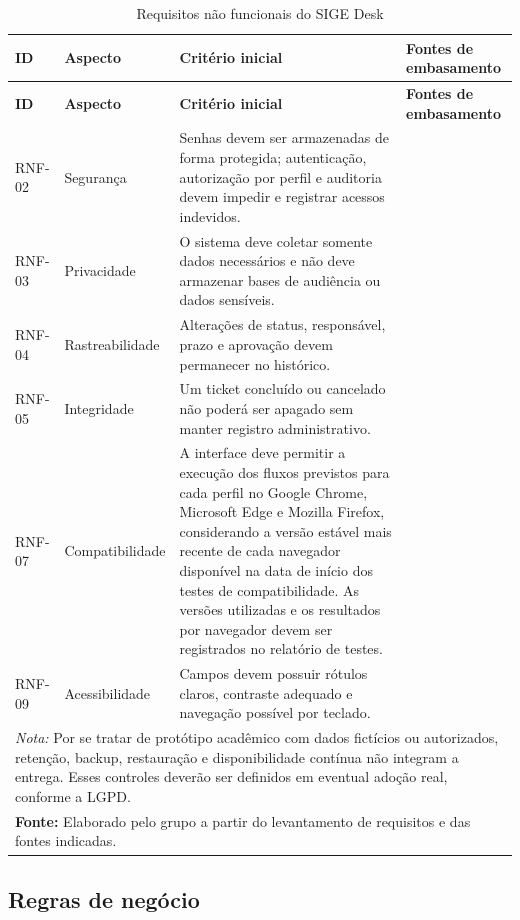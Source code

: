 \begin{longtable}{p{}p{}p{}p{}}
\caption{Requisitos não funcionais do SIGE Desk}\label{tab:requisitos-nao-funcionais}\\
\hline
\textbf{ID} & \textbf{Aspecto} & \textbf{Critério inicial} & \textbf{Fontes de embasamento} \\
\hline
\endfirsthead
\hline
\textbf{ID} & \textbf{Aspecto} & \textbf{Critério inicial} & \textbf{Fontes de embasamento} \\
\hline
\endhead
RNF-02 & Segurança & Senhas devem ser armazenadas de forma protegida; autenticação, autorização por perfil e auditoria devem impedir e registrar acessos indevidos. & \cite{brasil2018,iso29148} \\
RNF-03 & Privacidade & O sistema deve coletar somente dados necessários e não deve armazenar bases de audiência ou dados sensíveis. & \cite{brasil2018,daoud2023} \\
RNF-04 & Rastreabilidade & Alterações de status, responsável, prazo e aprovação devem permanecer no histórico. & \cite{servicedesk2023,brasil2018} \\
RNF-05 & Integridade & Um ticket concluído ou cancelado não poderá ser apagado sem manter registro administrativo. & \cite{iso29148,brasil2018} \\
RNF-07 & Compatibilidade & A interface deve permitir a execução dos fluxos previstos para cada perfil no Google Chrome, Microsoft Edge e Mozilla Firefox, considerando a versão estável mais recente de cada navegador disponível na data de início dos testes de compatibilidade. As versões utilizadas e os resultados por navegador devem ser registrados no relatório de testes. & \cite{iso29148} \\
RNF-09 & Acessibilidade & Campos devem possuir rótulos claros, contraste adequado e navegação possível por teclado. & \cite{radhitya2024} \\
\multicolumn{4}{p{0.95\textwidth}}{\footnotesize\textit{Nota:} Por se tratar de protótipo acadêmico com dados fictícios ou autorizados, retenção, backup, restauração e disponibilidade contínua não integram a entrega. Esses controles deverão ser definidos em eventual adoção real, conforme a LGPD.} \\
\hline
\multicolumn{4}{l}{\footnotesize\textbf{Fonte:} Elaborado pelo grupo a partir do levantamento de requisitos e das fontes indicadas.}
\end{longtable}

\subsection{Regras de negócio}

